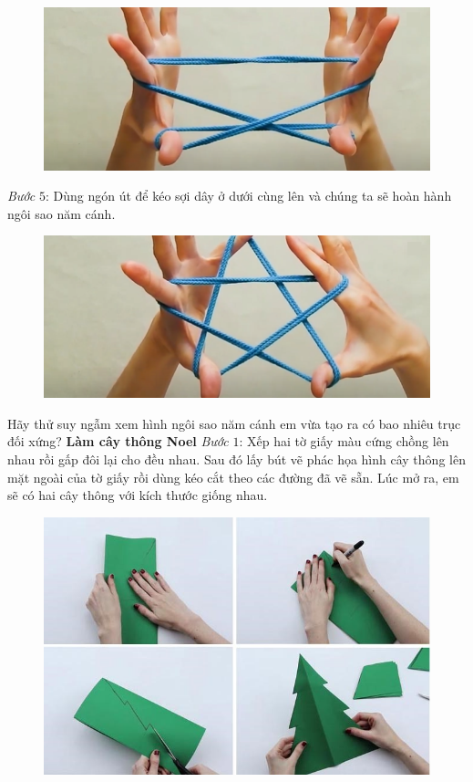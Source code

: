 \begin{multicols}{2}
\begin{figure}[H]
		\vspace*{-5pt}
		\centering
		\captionsetup{labelformat= empty, justification=centering}
		\includegraphics[width= 0.8\linewidth]{4}
		\vspace*{-10pt}
	\end{figure}
	\textit{Bước} $5$: Dùng ngón út để kéo sợi dây ở dưới cùng lên và chúng ta sẽ hoàn hành ngôi sao năm cánh.
	\begin{figure}[H]
		\vspace*{5pt}
		\centering
		\captionsetup{labelformat= empty, justification=centering}
		\includegraphics[width= 0.8\linewidth]{5}
		\vspace*{-5pt}
	\end{figure}
	Hãy thử suy ngẫm xem hình ngôi sao năm cánh em vừa tạo ra có bao nhiêu trục đối xứng?
	\vskip 0.1cm
	\textbf{\color{toancuabi}Làm cây thông Noel}
	\vskip 0.1cm
	\textit{Bước} $1$: Xếp hai tờ giấy màu cứng chồng lên nhau rồi gấp đôi lại cho đều nhau. Sau đó lấy bút vẽ phác họa hình cây thông lên mặt ngoài của tờ giấy rồi dùng kéo cắt theo các đường đã vẽ sẵn. Lúc mở ra, em sẽ có hai cây thông với kích thước giống nhau.
	\begin{figure}[H]
		\vspace*{-5pt}
		\centering
		\captionsetup{labelformat= empty, justification=centering}
		\includegraphics[width= 1\linewidth]{6}

\end{figure}
\end{multicols}
